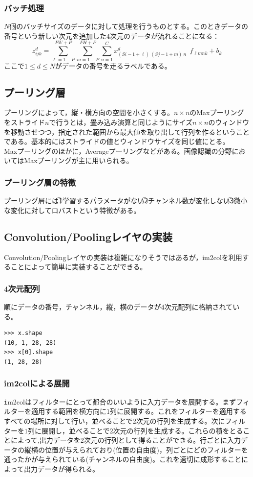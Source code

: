 \documentclass{jarticle}
\begin{document}
\subsubsection{バッチ処理}
$N$個のバッチサイズのデータに対して処理を行うものとする。このときデータの番号という新しい次元を追加した$4$次元のデータが流れることになる：
\[
z^{d}_{ijk} = \sum_{\ell=1-P}^{FW+P} \sum_{m = 1-P}^{FH+P} \sum_{n = 1}^{C} x^d_{(Si-1+\ell)~(Sj-1+m)~n}~~ f_{\ell m n k} + b_k
\]
ここで$1 \leq d \leq N$がデータの番号を走るラベルである。
\subsection{プーリング層}
プーリングによって，縦・横方向の空間を小さくする。$n\times n$のMaxプーリングをストライド$n$で行うとは，畳み込み演算と同じようにサイズ$n\times n$のウィンドウを移動させつつ，指定された範囲から最大値を取り出して行列を作るということである。基本的にはストライドの値とウィンドウサイズを同じ値にとる。\\
Maxプーリングのほかに，Averageプーリングなどがある。画像認識の分野においてはMaxプーリングが主に用いられる。
\subsubsection{プーリング層の特徴}
プーリング層には\textcircled{1}学習するパラメータがない\textcircled{2}チャンネル数が変化しない\textcircled{3}微小な変化に対してロバストという特徴がある。
\subsection{Convolution/Poolingレイヤの実装}
Convolution/Poolingレイヤの実装は複雑になりそうではあるが，im2colを利用することによって簡単に実装することができる。
\subsubsection{$4$次元配列}
順にデータの番号，チャンネル，縦，横のデータが$4$次元配列に格納されている。
\begin{lstlisting}
>>> x.shape
(10, 1, 28, 28)
>>> x[0].shape
(1, 28, 28)
\end{lstlisting}
\subsubsection{im2colによる展開}
{\texttt im2col}はフィルターにとって都合のいいように入力データを展開する。まずフィルターを適用する範囲を横方向に$1$列に展開する。これをフィルターを適用するすべての場所に対して行い，並べることで$2$次元の行列を生成する。次にフィルターを$1$列に展開し，並べることで$2$次元の行列を生成する。これらの積をとることによって,出力データを$2$次元の行列として得ることができる。行ごとに入力データの縦横の位置が与えられており(位置の自由度)，列ごとにどのフィルターを通ったかが与えられている(チャンネルの自由度)。これを適切に成形することによって出力データが得られる。
\end{document}
